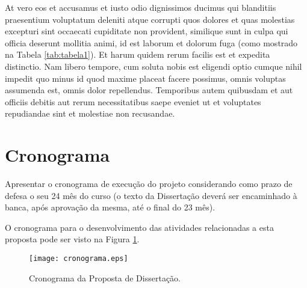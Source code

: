 At vero eos et accusamus et iusto odio dignissimos ducimus qui blanditiis praesentium voluptatum deleniti atque corrupti quos dolores et quas molestias excepturi sint occaecati cupiditate non provident, similique sunt in culpa qui officia deserunt mollitia animi, id est laborum et dolorum fuga (como mostrado na Tabela \ref{tab:tabela1}). Et harum quidem rerum facilis est et expedita distinctio. Nam libero tempore, cum soluta nobis est eligendi optio cumque nihil impedit quo minus id quod maxime placeat facere possimus, omnis voluptas assumenda est, omnis dolor repellendus. Temporibus autem quibusdam et aut officiis debitis aut rerum necessitatibus saepe eveniet ut et voluptates repudiandae sint et molestiae non recusandae.


\section{Cronograma}
\textcolor{RedOrange}{Apresentar o cronograma de execução do projeto considerando como prazo de defesa o seu 24 mês do curso (o texto da Dissertação deverá ser encaminhado à banca, após aprovação da mesma, até o final do 23 mês).}

\lipsum[11]

O cronograma para o desenvolvimento das atividades relacionadas a esta proposta pode ser visto na Figura \ref{fig:cronograma}.


\begin{figure}[!h]
	\centering
	\texttt{[image: cronograma.eps]}
	\caption{Cronograma da Proposta de Disserta\c{c}\~{a}o.}
	\label{fig:cronograma}
\end{figure}


